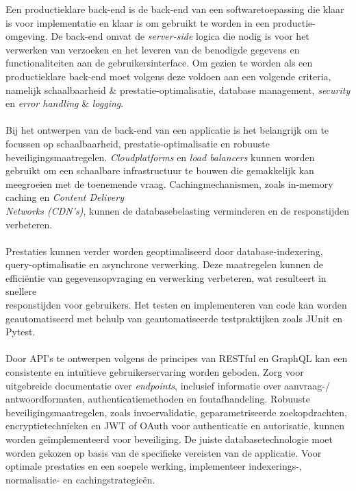 Een productieklare back-end is de back-end van een softwaretoepassing die klaar is voor implementatie en klaar is om gebruikt te worden in een productie-\\omgeving. De back-end omvat de \textit{server-side} logica die nodig is voor het \\verwerken van verzoeken en het leveren van de benodigde gegevens en \\functionaliteiten aan de gebruikersinterface. Om gezien te worden als een \\productieklare back-end moet volgens \textcite{Senthilkumar2023} deze voldoen aan een volgende criteria, namelijk schaalbaarheid & prestatie-optimalisatie, database management, \textit{security} en \textit{error handling} & \textit{logging}. 
 \\  \\
Bij het ontwerpen van de back-end van een applicatie is het belangrijk om te \\focussen op schaalbaarheid, prestatie-optimalisatie en robuuste beveiligingsmaatregelen. \textit{Cloudplatforms} en \textit{load balancers} kunnen worden gebruikt om een schaalbare infrastructuur te bouwen die gemakkelijk kan meegroeien met de toenemende vraag. Cachingmechanismen, zoals in-memory caching en \textit{Content Delivery} \\\textit{Networks (CDN's)}, kunnen de databasebelasting verminderen en de responstijden verbeteren.
 \\  \\
Prestaties kunnen verder worden geoptimaliseerd door database-indexering, query-optimalisatie en asynchrone verwerking. Deze maatregelen kunnen de efficiëntie van gegevensopvraging en verwerking verbeteren, wat resulteert in snellere \\responstijden voor gebruikers. Het testen en implementeren van code kan worden geautomatiseerd met behulp van geautomatiseerde testpraktijken zoals JUnit en Pytest.
 \\  \\
Door API's te ontwerpen volgens de principes van RESTful en GraphQL kan een \\consistente en intuïtieve gebruikerservaring worden geboden. Zorg voor \\uitgebreide documentatie over \textit{endpoints}, inclusief informatie over aanvraag-/ \\antwoordformaten, authenticatiemethoden en foutafhandeling. Robuuste \\beveiligingsmaatregelen, zoals invoervalidatie, geparametriseerde zoekopdrachten, encryptietechnieken en JWT of OAuth voor authenticatie en autorisatie, kunnen worden geïmplementeerd voor beveiliging. De juiste databasetechnologie moet worden gekozen op basis van de specifieke vereisten van de applicatie. Voor \\optimale prestaties en een soepele werking, implementeer indexerings-, normalisatie- en cachingstrategieën.
